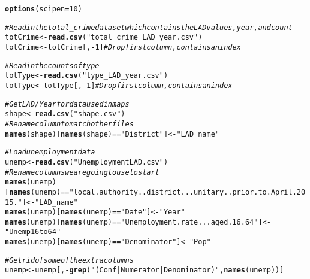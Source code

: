 \documentclass{article}\usepackage[]{graphicx}\usepackage[]{color}
\makeatletter
\newcommand{\hlnum}[1]{\textcolor[rgb]{0.686,0.059,0.569}{#1}}%
\newcommand{\hlstr}[1]{\textcolor[rgb]{0.192,0.494,0.8}{#1}}%
\newcommand{\hlcom}[1]{\textcolor[rgb]{0.678,0.584,0.686}{\textit{#1}}}%
\newcommand{\hlopt}[1]{\textcolor[rgb]{0,0,0}{#1}}%
\newcommand{\hlstd}[1]{\textcolor[rgb]{0.345,0.345,0.345}{#1}}%
\newcommand{\hlkwb}[1]{\textcolor[rgb]{0.69,0.353,0.396}{#1}}%
\newcommand{\hlkwc}[1]{\textcolor[rgb]{0.333,0.667,0.333}{#1}}%
\newcommand{\hlkwd}[1]{\textcolor[rgb]{0.737,0.353,0.396}{\textbf{#1}}}%
\newenvironment{kframe}{%
 \def\at@end@of@kframe{}%
 \ifinner\ifhmode%
  \def\at@end@of@kframe{\end{minipage}}%
  \begin{minipage}{\columnwidth}%
 \fi\fi%
 \def\FrameCommand##1{\hskip\@totalleftmargin \hskip-\fboxsep
 \colorbox{shadecolor}{##1}\hskip-\fboxsep
     \hskip-\linewidth \hskip-\@totalleftmargin \hskip\columnwidth}%
 \MakeFramed {\advance\hsize-\width
   \@totalleftmargin\z@ \linewidth\hsize
   \@setminipage}}%
 {\par\unskip\endMakeFramed%
 \at@end@of@kframe}
\newenvironment{knitrout}{}{} %
\makeatother
\begin{document}
\begin{knitrout}
\color{fgcolor}\begin{kframe}
\begin{alltt}
\hlkwd{options}\hlstd{(}\hlkwc{scipen} \hlstd{=} \hlnum{10}\hlstd{)}

\hlcom{#Read in the total_crime dataset which contains the LAD values, year, and count}
\hlstd{totCrime} \hlkwb{<-} \hlkwd{read.csv}\hlstd{(}\hlstr{"total_crime_LAD_year.csv"}\hlstd{)}
\hlstd{totCrime} \hlkwb{<-} \hlstd{totCrime[,}\hlopt{-}\hlnum{1}\hlstd{]} \hlcom{#Drop first column, contains an index}

\hlcom{#Read in the counts of type}
\hlstd{totType} \hlkwb{<-} \hlkwd{read.csv}\hlstd{(}\hlstr{"type_LAD_year.csv"}\hlstd{)}
\hlstd{totType} \hlkwb{<-} \hlstd{totType[,}\hlopt{-}\hlnum{1}\hlstd{]} \hlcom{#Drop first column, contains an index}

\hlcom{#Get LAD/Year for data used in maps}
\hlstd{shape} \hlkwb{<-} \hlkwd{read.csv}\hlstd{(}\hlstr{"shape.csv"}\hlstd{)}
\hlcom{#Rename column to match other files}
\hlkwd{names}\hlstd{(shape)[}\hlkwd{names}\hlstd{(shape)}\hlopt{==}\hlstr{"District"}\hlstd{]} \hlkwb{<-} \hlstr{"LAD_name"}

\hlcom{#Load unemployment data}
\hlstd{unemp} \hlkwb{<-} \hlkwd{read.csv}\hlstd{(}\hlstr{"UnemploymentLAD.csv"}\hlstd{)}
\hlcom{#Rename columns we are going to use to start}
\hlkwd{names}\hlstd{(unemp)[}\hlkwd{names}\hlstd{(unemp)}\hlopt{==}\hlstr{"local.authority..district...unitary..prior.to.April.2015."}\hlstd{]} \hlkwb{<-} \hlstr{"LAD_name"}
\hlkwd{names}\hlstd{(unemp)[}\hlkwd{names}\hlstd{(unemp)}\hlopt{==}\hlstr{"Date"}\hlstd{]} \hlkwb{<-} \hlstr{"Year"}
\hlkwd{names}\hlstd{(unemp)[}\hlkwd{names}\hlstd{(unemp)}\hlopt{==}\hlstr{"Unemployment.rate...aged.16.64"}\hlstd{]} \hlkwb{<-} \hlstr{"Unemp16to64"}
\hlkwd{names}\hlstd{(unemp)[}\hlkwd{names}\hlstd{(unemp)}\hlopt{==}\hlstr{"Denominator"}\hlstd{]} \hlkwb{<-} \hlstr{"Pop"}

\hlcom{#Get rid of some of the extra columns}
\hlstd{unemp} \hlkwb{<-} \hlstd{unemp[,}\hlopt{-}\hlkwd{grep}\hlstd{(}\hlstr{"(Conf|Numerator|Denominator)"}\hlstd{,}\hlkwd{names}\hlstd{(unemp))]}


\end{alltt}
\end{kframe}
\end{knitrout}
\end{document}
